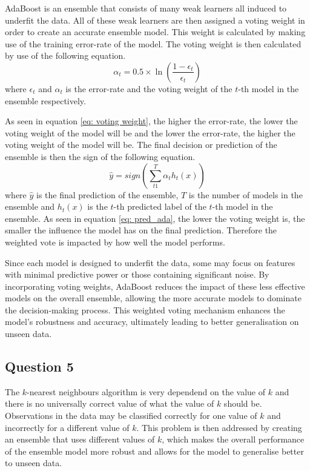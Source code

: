 \documentclass[10pt]{article}
\begin{document}
AdaBoost is an ensemble that consists of many weak learners all induced to underfit the data. All of these weak learners
are then assigned a voting weight in order to create an accurate ensemble model. This weight is calculated by making
use of the training error-rate of the model. The voting weight is then calculated by use of
the following equation.
\begin{equation}
    \alpha_t = 0.5 \times \ln \left( \frac{1 - \epsilon_t}{\epsilon_t} \right) \label{eq: voting weight}
\end{equation}
where $\epsilon_t$ and $\alpha_t$ is the error-rate and the voting weight of the $t$-th model in the ensemble
respectively.

As seen in equation \ref{eq: voting weight}, the higher the error-rate, the lower the voting weight of the model will be
and the lower the error-rate, the higher the voting weight of the model will be. The final decision or prediction of the
ensemble is then the sign of the following equation.
\begin{equation}
    \hat{y} = sign \left( \sum_{t1}^{T} \alpha_t h_t(x)\right) \label{eq: pred_ada}
\end{equation}
where $\hat{y}$ is the final prediction of the ensemble, $T$ is the number of models in the ensemble and $h_t(x)$
is the $t$-th predicted label of the $t$-th model in the ensemble. As seen in equation \ref{eq: pred_ada}, the
lower the voting weight is, the smaller the influence the model has on the final prediction. Therefore the weighted
vote is impacted by how well the model performs.

Since each model is designed to underfit the data, some may focus on features with minimal predictive power or those
containing significant noise. By incorporating voting weights, AdaBoost reduces the impact of these less effective
models on the overall ensemble, allowing the more accurate models to dominate the decision-making process. This
weighted voting mechanism enhances the model's robustness and accuracy, ultimately leading to better generalisation
on unseen data.

\subsection*{Question 5}

The $k$-nearest neighbours algorithm is very dependend on the value of $k$ and there is no universally correct
value of what the value of $k$ should be. Observations in the data may be classified correctly for one value
of $k$ and incorrectly for a different value of $k$. This problem is then addressed by creating an ensemble that
uses different values of $k$, which makes the overall performance of the ensemble model more robust and allows for
the model to generalise better to unseen data.
\end{document}
